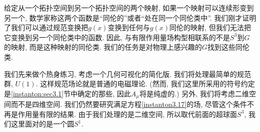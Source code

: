 给定从一个拓扑空间到另一个拓扑空间的两个映射, 如果一个映射可以连续形变到另一个, 数学家称这两个函数是“同伦的”或者“处在同一个同伦类中”. 我们刚才证明了我们可以通过规范变换把$g(x)$变换到任何与$g(x)$同伦的映射, 但我们无法把它变换到另一个同伦类中的函数. 因此, 与有限作用量场构型相联系的不是$S^{3}$到$G$的映射, 而是这种映射的同伦类. 我们的任务是对物理上感兴趣的$G$找到这些同伦类.

我们先来做个热身练习, 考虑一个几何可视化的简化版. 我们将处理最简单的规范群, $U(1)$. 这样规范场论就是普通的电磁理论. (然而, 我们这里所采用的符号约定是\ref{instanton:sec3.1}节中确定的那些, 因此$A_{\mu}$将是纯虚的.) 另外, 我们将考虑二维空间而不是四维空间. 我们仍然要研究满足方程\eqref{instanton3.17}的场, 尽管这个条件不再是作用量有限的结果. 由于我们处理的是二维空间, 所以取代前面的超球面$S^{3}$, 我们这里面对的是一个圆$S^{1}$.

